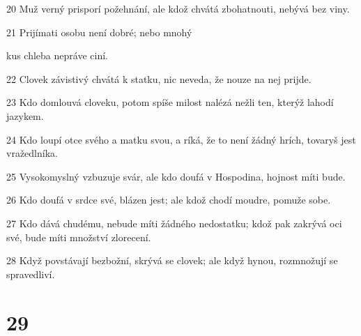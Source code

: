 \par 20 Muž verný prisporí požehnání, ale kdož chvátá zbohatnouti, nebývá bez viny.
\par 21 Prijímati osobu není dobré; nebo mnohý \par kus chleba nepráve ciní.
\par 22 Clovek závistivý chvátá k statku, nic neveda, že nouze na nej prijde.
\par 23 Kdo domlouvá cloveku, potom spíše milost nalézá nežli ten, kterýž lahodí jazykem.
\par 24 Kdo loupí otce svého a matku svou, a ríká, že to není žádný hrích, tovaryš jest vražedlníka.
\par 25 Vysokomyslný vzbuzuje svár, ale kdo doufá v Hospodina, hojnost míti bude.
\par 26 Kdo doufá v srdce své, blázen jest; ale kdož chodí moudre, pomuže sobe.
\par 27 Kdo dává chudému, nebude míti žádného nedostatku; kdož pak zakrývá oci své, bude míti množství zlorecení.
\par 28 Když povstávají bezbožní, skrývá se clovek; ale když hynou, rozmnožují se spravedliví.

\chapter{29}

